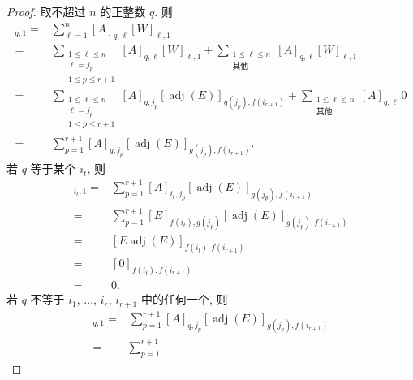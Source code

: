 \begin{proof}
    取不超过 \(n\) 的正整数 \(q\).
    则
    \begin{align*}
        [AW]_{q,1}
        = {} &
        \sum_{\ell = 1}^{n}
        {[A]_{q,\ell} [W]_{\ell,1}}
        \\
        = {} &
        \sum_{\substack{
        1 \leq \ell \leq n \\
        \ell = j_p         \\
                1 \leq p \leq r+1
            }}
        {[A]_{q,\ell} [W]_{\ell,1}}
        +
        \sum_{\substack{
        1 \leq \ell \leq n \\
                \text{其他}
            }}
        {[A]_{q,\ell} [W]_{\ell,1}}
        \\
        = {} &
        \sum_{\substack{
        1 \leq \ell \leq n \\
        \ell = j_p         \\
                1 \leq p \leq r+1
            }}
        {[A]_{q,j_p}
                [\operatorname{adj} {(E)}]_{g(j_p),f(i_{r+1})}}
        +
        \sum_{\substack{
        1 \leq \ell \leq n \\
                \text{其他}
            }}
        {[A]_{q,\ell}\, 0}
        \\
        = {} &
        \sum_{p=1}^{r+1}
        {[A]_{q,j_p}
            [\operatorname{adj} {(E)}]_{g(j_p),f(i_{r+1})}}.
    \end{align*}
    若 \(q\) 等于某个 \(i_t\), 则
    \begin{align*}
        [AW]_{i_t,1}
        = {} &
        \sum_{p=1}^{r+1}
        {[A]_{i_t,j_p}
            [\operatorname{adj} {(E)}]_{g(j_p),f(i_{r+1})}}
        \\
        = {} &
        \sum_{p=1}^{r+1}
        {[E]_{f(i_t),g(j_p)}
            [\operatorname{adj} {(E)}]_{g(j_p),f(i_{r+1})}}
        \\
        = {} &
        [E \operatorname{adj} {(E)}]_{f(i_t),f(i_{r+1})}
        \\
        = {} &
        [0]_{f(i_t),f(i_{r+1})}
        \\
        = {} & 0.
    \end{align*}
    若 \(q\) 不等于
    \(i_1\), \(\dots\), \(i_r\), \(i_{r+1}\)
    中的任何一个,
    则
    \begin{align*}
        [AW]_{q,1}
        = {} &
        \sum_{p=1}^{r+1}
        {[A]_{q,j_p}
            [\operatorname{adj} {(E)}]_{g(j_p),f(i_{r+1})}}
        \\
        = {} &
        \sum_{p=1}^{r+1}

\end{align*}
\end{proof}
